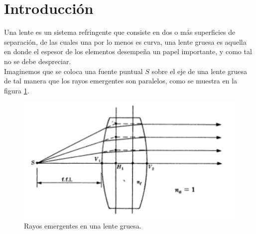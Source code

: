 \documentclass[13,twocolumn,letterpaper]{article}
\begin{document}
\section{Introducción }
{ 
	Una lente es un sistema refringente que consiste en dos o m\'as superficies de separaci\'on, de las cuales una por lo menos es curva, una lente gruesa es aquella en donde el espesor de los elementos desempeña  un papel importante, y como tal no se debe despreciar.\\
	Imaginemos que se coloca una fuente puntual $S$ sobre el eje de una lente gruesa de tal manera que los rayos emergentes son paralelos, como se muestra en la figura \ref{fig:fig1}.
	
	\begin{figure}[h!]
		\centering
		\includegraphics[width=0.9\linewidth]{fig1}
		\caption{\footnotesize{Rayos emergentes en una lente gruesa.}}
		\label{fig:fig1}
	\end{figure}
	
}
\end{document}
